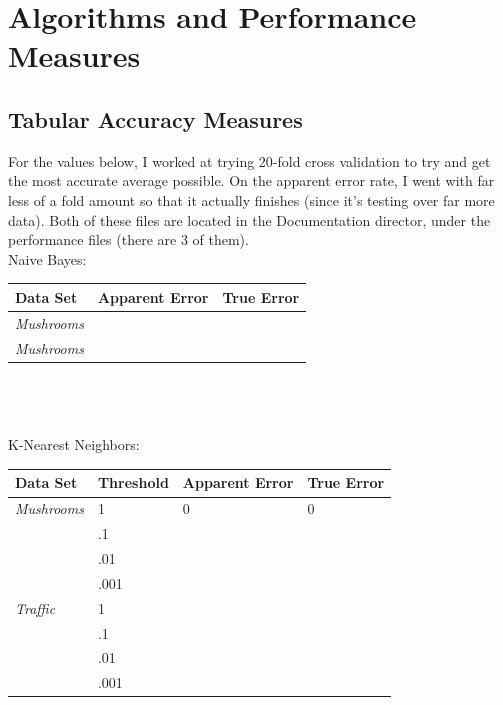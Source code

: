 \documentclass{article}
\begin{document}

\section{Algorithms and Performance Measures}
\subsection{Tabular Accuracy Measures}
For the values below, I worked at trying 20-fold cross validation to try and get the most accurate average possible.  On the apparent error rate, I went with far less of a fold amount so that it actually finishes (since it's testing over far more data).  Both of these files are located in the Documentation director, under the performance files (there are 3 of them).
\\
Naive Bayes:\\
\begin{tabular}{ | l | l | l |}
  \hline
  \textbf{Data Set} & \textbf{Apparent Error} & \textbf{True Error} \\ \hline
  \textit{Mushrooms} & & \\ \hline
  \textit{Mushrooms} & & \\ \hline
\end{tabular}
\\ \\ \\
K-Nearest Neighbors:\\
\begin{tabular}{ | l | l | l | l | }
  \hline			
  \textbf{Data Set} & Threshold & \textbf{Apparent Error} & \textbf{True Error} \\ \hline
  \textit{Mushrooms} & 1 & 0 & 0 \\
    & .1 & & \\
    & .01 & & \\
    & .001 & & \\ \hline
  \textit{Traffic} & 1 & & \\
    & .1 & & \\
    & .01 & & \\
    & .001 & & \\\hline
\end{tabular}
\end{document}
